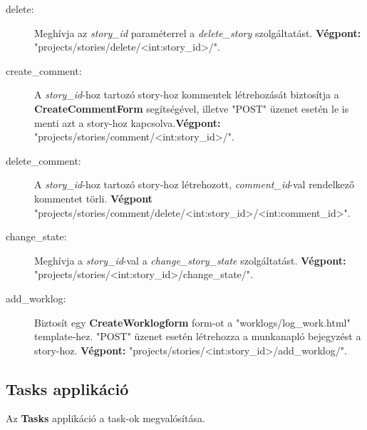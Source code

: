 \begin{itemize}
\begin{description}
		\item[delete:] Meghívja az \textit{story\_id} paraméterrel a \textit{delete\_story} szolgáltatást. \textbf{Végpont:} "projects/stories/delete/<int:story\_id>/".
		\item[create\_comment:] A \textit{story\_id}-hoz tartozó story-hoz kommentek létrehozását biztosítja a \textbf{CreateCommentForm} segítségével, illetve "POST" üzenet esetén le is menti azt a story-hoz kapcsolva.\textbf{Végpont:} "projects/stories/comment/<int:story\_id>/".
		\item[delete\_comment:] A \textit{story\_id}-hoz tartozó story-hoz létrehozott, \textit{comment\_id}-val rendelkező kommentet törli. \textbf{Végpont} "projects/stories/comment/delete/<int:story\_id>/<int:comment\_id>".
		\item[change\_state:] Meghívja a \textit{story\_id}-val a \textit{change\_story\_state} szolgáltatást. \textbf{Végpont:} "projects/stories/<int:story\_id>/change\_state/".
		\item[add\_worklog:] Biztosít egy \textbf{CreateWorklogform} form-ot a "worklogs/log\_work.html" template-hez. "POST" üzenet esetén létrehozza a munkanapló bejegyzést a story-hoz. \textbf{Végpont:} "projects/stories/<int:story\_id>/add\_worklog/".
	\end{description}
\end{itemize}	

\subsection{Tasks applikáció}

Az \textbf{Tasks} applikáció a task-ok megvalósítása. 

